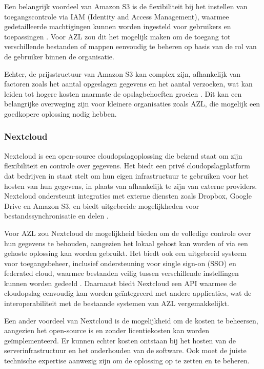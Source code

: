 Een belangrijk voordeel van Amazon S3 is de flexibiliteit bij het instellen van toegangscontrole via IAM (Identity and Access Management), waarmee gedetailleerde machtigingen kunnen worden ingesteld voor gebruikers en toepassingen \autocite{aws_iam}. Voor AZL zou dit het mogelijk maken om de toegang tot verschillende bestanden of mappen eenvoudig te beheren op basis van de rol van de gebruiker binnen de organisatie.

Echter, de prijsstructuur van Amazon S3 kan complex zijn, afhankelijk van factoren zoals het aantal opgeslagen gegevens en het aantal verzoeken, wat kan leiden tot hogere kosten naarmate de opslagbehoeften groeien \autocite{aws_pricing}. Dit kan een belangrijke overweging zijn voor kleinere organisaties zoals AZL, die mogelijk een goedkopere oplossing nodig hebben.

\subsubsection{Nextcloud}
Nextcloud is een open-source cloudopslagoplossing die bekend staat om zijn flexibiliteit en controle over gegevens. Het biedt een privé cloudopslagplatform dat bedrijven in staat stelt om hun eigen infrastructuur te gebruiken voor het hosten van hun gegevens, in plaats van afhankelijk te zijn van externe providers. Nextcloud ondersteunt integraties met externe diensten zoals Dropbox, Google Drive en Amazon S3, en biedt uitgebreide mogelijkheden voor bestandssynchronisatie en delen \autocite{nextcloud_features}.

Voor AZL zou Nextcloud de mogelijkheid bieden om de volledige controle over hun gegevens te behouden, aangezien het lokaal gehost kan worden of via een gehoste oplossing kan worden gebruikt. Het biedt ook een uitgebreid systeem voor toegangsbeheer, inclusief ondersteuning voor single sign-on (SSO) en federated cloud, waarmee bestanden veilig tussen verschillende instellingen kunnen worden gedeeld \autocite{nextcloud_sso}. Daarnaast biedt Nextcloud een API waarmee de cloudopslag eenvoudig kan worden geïntegreerd met andere applicaties, wat de interoperabiliteit met de bestaande systemen van AZL vergemakkelijkt.

Een ander voordeel van Nextcloud is de mogelijkheid om de kosten te beheersen, aangezien het open-source is en zonder licentiekosten kan worden geïmplementeerd. Er kunnen echter kosten ontstaan bij het hosten van de serverinfrastructuur en het onderhouden van de software. Ook moet de juiste technische expertise aanwezig zijn om de oplossing op te zetten en te beheren.


